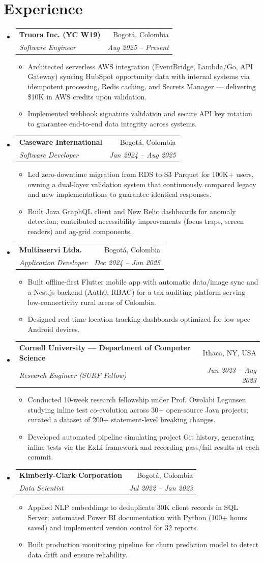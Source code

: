 \documentclass[letterpaper,11pt]{article}
\makeatletter
\newcommand{\cvItem}[1]{
  \item\small{#1 \vspace{-2pt}}
}
\newcommand{\cvEntry}[4]{
  \vspace{-2pt}\item
    \begin{tabular*}{0.97\textwidth}[t]{l@{\extracolsep{\fill}}r}
      \textbf{#1} & \small #3 \\
      \textit{\small#2} & \textit{\small #4} \\
    \end{tabular*}\vspace{-7pt}
}
\newcommand{\cvListStart}{\begin{itemize}[leftmargin=0.15in, label={}]}
\newcommand{\cvListEnd}{\end{itemize}}
\newcommand{\cvItemListStart}{\begin{itemize}[itemsep=-2pt]}
\newcommand{\cvItemListEnd}{\end{itemize}\vspace{-5pt}}
\makeatother
\begin{document}
\section{Experience}
\cvListStart
  \cvEntry
    {Truora Inc. {\footnotesize (YC W19)}}
    {Software Engineer}
    {Bogotá, Colombia}
    {Aug 2025 -- Present}
    \cvItemListStart
      \cvItem{Architected serverless AWS integration (EventBridge, Lambda/Go, API Gateway) syncing HubSpot opportunity data with internal systems via idempotent processing, Redis caching, and Secrets Manager — delivering \$10K in AWS credits upon validation.}
      \cvItem{Implemented webhook signature validation and secure API key rotation to guarantee end-to-end data integrity across systems.}
    \cvItemListEnd
  \cvEntry
    {Caseware International}
    {Software Developer}
    {Bogotá, Colombia}
    {Jan 2024 -- Aug 2025}
    \cvItemListStart
      \cvItem{Led zero-downtime migration from RDS to S3 Parquet for 100K+ users, owning a dual-layer validation system that continuously compared legacy and new implementations to guarantee identical responses.}
      \cvItem{Built Java GraphQL client and New Relic dashboards for anomaly detection; contributed accessibility improvements (focus traps, screen readers) and ag-grid components.}
    \cvItemListEnd
  \cvEntry
    {Multiaservi Ltda.}
    {Application Developer}
    {Bogotá, Colombia}
    {Dec 2024 -- Jun 2025}
    \cvItemListStart
      \cvItem{Built offline-first Flutter mobile app with automatic data/image sync and a Nest.js backend (Auth0, RBAC) for a tax auditing platform serving low-connectivity rural areas of Colombia.}
      \cvItem{Designed real-time location tracking dashboards optimized for low-spec Android devices.}
    \cvItemListEnd
  \cvEntry
    {Cornell University — Department of Computer Science}
    {Research Engineer (SURF Fellow)}
    {Ithaca, NY, USA}
    {Jun 2023 -- Aug 2023}
    \cvItemListStart
      \cvItem{Conducted 10-week research fellowship under Prof. Owolabi Legunsen studying inline test co-evolution across 30+ open-source Java projects; curated a dataset of 200+ statement-level breaking changes.}
      \cvItem{Developed automated pipeline simulating project Git history, generating inline tests via the ExLi framework and recording pass/fail results at each commit.}
    \cvItemListEnd
  \cvEntry
    {Kimberly-Clark Corporation}
    {Data Scientist}
    {Bogotá, Colombia}
    {Jul 2022 -- Jan 2023}
    \cvItemListStart
      \cvItem{Applied NLP embeddings to deduplicate 30K client records in SQL Server; automated Power BI documentation with Python (100+ hours saved) and implemented version control for 32 reports.}
      \cvItem{Built production monitoring pipeline for churn prediction model to detect data drift and ensure reliability.}
    \cvItemListEnd
\cvListEnd
\end{document}

